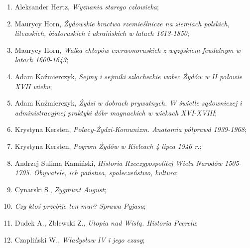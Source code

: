 \documentclass[a4paper,11pt]{article}
\begin{document}
\begin{enumerate}
\item Aleksander Hertz, \textit{Wyznania starego człowieka};



\item Maurycy Horn, \textit{Żydowskie bractwa rzemieślnicze na ziemiach
    polskich, litewskich, białoruskich i ukraińskich w latach
    1613-1850};



\item Maurycy Horn, \textit{Walka chłopów czerwonoruskich z wyzyskiem
    feudalnym w latach 1600-1643};



\item Adam Kaźmierczyk, \textit{Sejmy i sejmiki szlacheckie wobec Żydów
    w II połowie XVII wieku};



\item Adam Kaźmierczyk, \textit{Żydzi w dobrach prywatnych. W świetle
    sądowniczej i administracyjnej praktyki dóbr magnackich w wiekach
    XVI-XVIII};



\item Krystyna Kersten, \textit{Polacy-Żydzi-Komunizm. Anatomia półprawd
    1939-1968};



\item Krystyna Kersten, \textit{Pogrom Żydów w Kielcach 4 lipca 1946
    r.};



\item Andrzej Sulima Kamiński, \textit{Historia Rzeczypospolitej Wielu
    Narodów 1505-1795. Obywatele, ich państwa, społeczeństwo,
    kultura};



\item Cynarski S., \textit{Zygmunt August};



\item \textit{Czy ktoś przebije ten mur? Sprawa Pyjasa};



\item Dudek A., Zblewski Z., \textit{Utopia nad Wisłą. Historia
    Peerelu};



\item Czapliński W., \textit{Władysław IV i jego czasy};




\end{enumerate}
\end{document}
